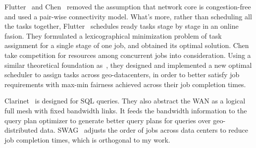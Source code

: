 \documentclass[base.tex]{subfiles}
\begin{document}
Flutter~\cite{hu2016flutter} and Chen~\cite{chen2018scheduling} removed the assumption that network core is congestion-free and used a pair-wise connectivity model. What's more, rather than scheduling all the tasks together, Flutter~\cite{hu2016flutter} schedules ready tasks stage by stage in an online fasion. They formulated a lexicographical minimization problem of task assignment for a single stage of one job, and obtained its optimal solution. Chen~\cite{chen2018scheduling} take competition for resources among concurrent jobs into consideration. Using a similar theoretical foundation as~\cite{hu2016flutter}, they designed and implemented a new optimal scheduler to assign tasks across geo-datacenters, in order to better satisfy job requirements with max-min fairness achieved across their job completion times. 

Clarinet~\cite{viswanathan2016clarinet} is designed for SQL queries. They also abstract the WAN as a logical full mesh with fixed bandwidth links. It feeds the bandwidth information to the query plan optimizer to generate better query plans for queries over geo-distributed data. SWAG~\cite{hung2015scheduling} adjusts the order of jobs across data centers to reduce job completion times, which is orthogonal to my work.
\end{document}
